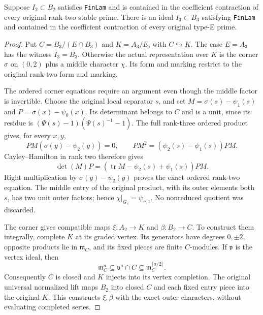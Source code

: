 \begin{theorem}\label{thm:rankthree-type-e}
Suppose $I_2\subset B_2$ satisfies \texttt{FinLam} and is contained
in the coefficient contraction of every original rank-two stable
prime.  There is an ideal $I_3\subset B_3$ satisfying
\texttt{FinLam} and contained in the coefficient contraction of
every original type-E prime.
\end{theorem}
\begin{proof}
Put $C=B_3/(E\cap B_3)$ and $K=A_3/E$, with $C\hookrightarrow K$.
The case $E=A_3$ has the witness $I_3=B_3$.  Otherwise the actual
representation over $K$ is the corner $\sigma$ on $(0,2)$ plus a
middle character $\chi$.  Its form and marking restrict to the
original rank-two form and marking.

The ordered corner equations require an argument even though the
middle factor is invertible.  Choose the original local separator
$s$, and set $M=\sigma(s)-\psi_1(s)$ and
$P=\sigma(x)-\psi_0(x)$.  Its determinant belongs to $C$ and is
a unit, since its residue is $(\Psi(s)-1)(\Psi(s)^{-1}-1)$.
The full rank-three ordered product gives, for every $x,y$,
\[
 PM(\sigma(y)-\psi_2(y))=0,\qquad
 PM^2=(\psi_2(s)-\psi_1(s))PM.
\]
Cayley--Hamilton in rank two therefore gives
\begin{equation}\label{eq:rankthree-corner-deletion}
 \det(M)P=(\operatorname{tr}M-\psi_2(s)+\psi_1(s))PM.
\end{equation}
Right multiplication by $\sigma(y)-\psi_2(y)$ proves the exact
ordered rank-two equation.  The middle entry of the original product,
with its outer elements both $s$, has two unit outer factors; hence
$\chi|_{G_v}=\psi_{v,1}$.  No nonreduced quotient was discarded.

The corner gives compatible maps $\xi:A_2\to K$ and
$\beta:B_2\to C$.  To construct them integrally, complete $K$ at
its graded vertex.  Its generators have degrees $0,\pm2$,
opposite products lie in $\mathfrak m_C$, and its fixed pieces are
finite $C$-modules.  If $\mathfrak v$ is the vertex ideal, then
\[
 \mathfrak m_C^a\subseteq\mathfrak v^a\cap C
       \subseteq\mathfrak m_C^{\lceil a/2\rceil}.
\]
Consequently $C$ is closed and $K$ injects into its vertex completion.
The original universal normalized lift maps $B_2$ into closed $C$
and each fixed entry piece into the original $K$.
This constructs $\xi,\beta$ with the exact outer characters,
without evaluating completed series.


\end{proof}

